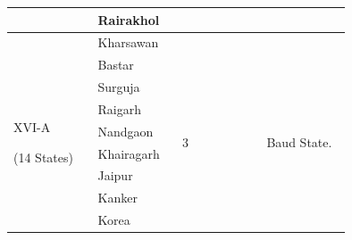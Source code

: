 \begin{longtable}{|p{0.23\linewidth}|p{0.23\linewidth}|p{0.23\linewidth}|p{0.23\linewidth}|}
 \\
\hline
 & Rairakhol

 \\
\hline
 & Kharsawan

 \\
\hline
\multirow{9}{*}{XVI-A









(14 States)







} & Bastar

 & \multirow{14}{*}{









3

















} & \multirow{14}{*}{









Baud State.

















} \\
\hline
 & Surguja

 \\
\hline
 & Raigarh

 \\
\hline
 & Nandgaon

 \\
\hline
 & Khairagarh

 \\
\hline
 & Jaipur

 \\
\hline
 & Kanker

 \\
\hline
 & Korea


\end{longtable}
